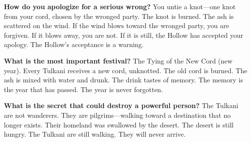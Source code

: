 \begin{almanac}
\textbf{How do you apologize for a serious wrong?} You untie a knot---one knot from your cord, chosen by the wronged party. The knot is burned. The ash is scattered on the wind. If the wind blows toward the wronged party, you are forgiven. If it blows away, you are not. If it is still, the Hollow has accepted your apology. The Hollow's acceptance is a warning.

\textbf{What is the most important festival?} The Tying of the New Cord (new year). Every Tulkani receives a new cord, unknotted. The old cord is burned. The ash is mixed with water and drunk. The drink tastes of memory. The memory is the year that has passed. The year is never forgotten.

\textbf{What is the secret that could destroy a powerful person?} The Tulkani are not wanderers. They are pilgrims---walking toward a destination that no longer exists. Their homeland was swallowed by the desert. The desert is still hungry. The Tulkani are still walking. They will never arrive.
\end{almanac}

\newpage

\newpage